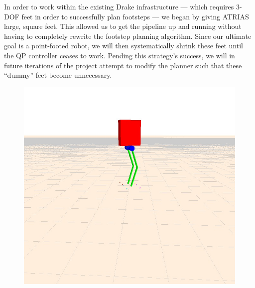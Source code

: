 \documentclass[letterpaper, 10 pt, conference]{ieeeconf}  %
\begin{document}
In order to work within the existing Drake infrastructure --- which requires 3-DOF feet in order to successfully plan footsteps --- we began by giving ATRIAS large, square feet. This allowed us to get the pipeline up and running without having to completely rewrite the footstep planning algorithm. Since our ultimate goal is a point-footed robot, we will then systematically shrink these feet until the QP controller ceases to work. Pending this strategy’s success, we will in future iterations of the project attempt to modify the planner such that these “dummy” feet become unnecessary.

   \begin{figure}[thpb]
      \centering
      \includegraphics[scale=0.3]{figures/runPassiveInitial.jpg}
      \label{footstep}
   \end{figure}
\end{document}
